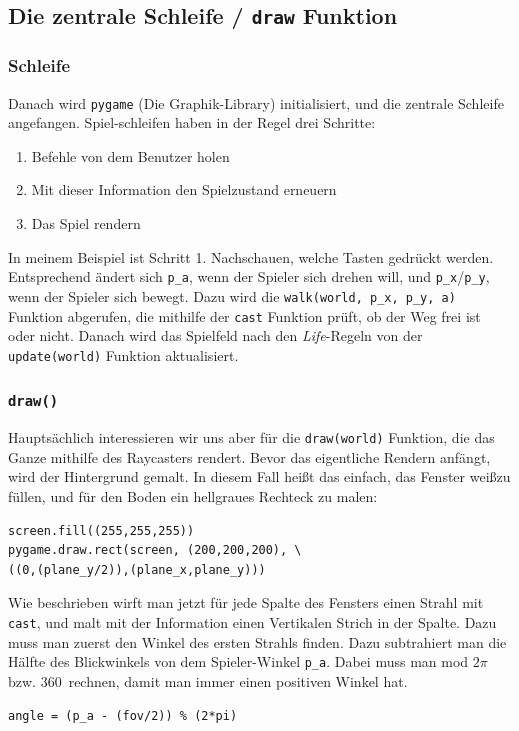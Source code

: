 \documentclass[a4paper,12pt]{report}
\begin{document}
\subsection{Die zentrale Schleife / \texttt{draw} Funktion}
\subsubsection{Schleife}
Danach wird \texttt{pygame} (Die Graphik-Library) initialisiert, und die zentrale Schleife angefangen. Spiel-schleifen haben in der Regel drei Schritte:
\begin{enumerate}
	\item Befehle von dem Benutzer holen
	\item Mit dieser Information den Spielzustand erneuern
	\item Das Spiel rendern
\end{enumerate}
In meinem Beispiel ist Schritt 1. Nachschauen, welche Tasten gedr\"uckt werden. Entsprechend \"andert sich \texttt{p\_a}, wenn der Spieler sich drehen will, und \texttt{p\_x}/\texttt{p\_y}, wenn der Spieler sich bewegt. Dazu wird die \texttt{walk(world, p\_x, p\_y, a)} Funktion abgerufen, die mithilfe der \texttt{cast} Funktion pr\"uft, ob der Weg frei ist oder nicht. Danach wird das Spielfeld nach den \textit{Life}-Regeln von der \texttt{update(world)} Funktion aktualisiert.

\subsubsection{\texttt{draw()}}
Haupts\"achlich interessieren wir uns aber f\"ur die \texttt{draw(world)} Funktion, die das Ganze mithilfe des Raycasters rendert. Bevor das eigentliche Rendern anf\"angt, wird der Hintergrund gemalt. In diesem Fall hei\ss t das einfach, das Fenster wei\ss  zu f\"ullen, und f\"ur den Boden ein hellgraues Rechteck zu malen:
\begin{Verbatim}[baselinestretch=1.0, xleftmargin=1cm]
screen.fill((255,255,255))
pygame.draw.rect(screen, (200,200,200), \
((0,(plane_y/2)),(plane_x,plane_y)))
\end{Verbatim}

Wie beschrieben wirft man jetzt f\"ur jede Spalte des Fensters einen Strahl mit \texttt{cast}, und malt mit der Information einen Vertikalen Strich in der Spalte. Dazu muss man zuerst den Winkel des ersten Strahls finden. Dazu subtrahiert man die H\"alfte des Blickwinkels von dem Spieler-Winkel \texttt{p\_a}. Dabei muss man mod $2\pi$ bzw. 360\textdegree\ rechnen, damit man immer einen positiven Winkel hat.
\begin{Verbatim}[baselinestretch=1.0, xleftmargin=1cm]
angle = (p_a - (fov/2)) % (2*pi)
\end{Verbatim}
\end{document}
